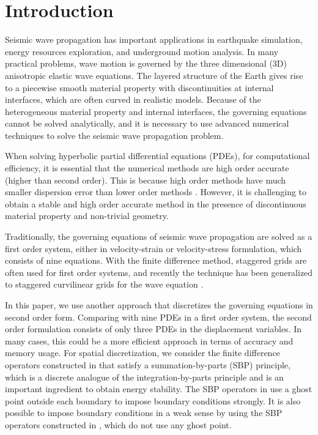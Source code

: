 \section{Introduction}
Seismic wave propagation has important applications in earthquake simulation, energy resources exploration, and underground motion analysis. In many practical problems, wave motion is governed by the three dimensional (3D) anisotropic elastic wave equations. The layered structure of the Earth gives rise to a piecewise smooth material property with discontinuities at internal interfaces, which are often curved in realistic models. Because of the heterogeneous material property and internal interfaces, the governing equations cannot be solved analytically, and it is necessary to use advanced numerical techniques to solve the seismic wave propagation problem.

When solving hyperbolic partial differential equations (PDEs), for computational efficiency, it is essential that the numerical methods are high order accurate (higher than second order). This is because high order methods have much smaller dispersion error than lower order methods  \cite{Hagstrom2012,Kreiss1972}. However, it is challenging to obtain a stable and high order accurate method in the presence of discontinuous material property and non-trivial geometry. 

Traditionally, the governing equations of seismic wave propagation are solved as a first order system, either in velocity-strain or velocity-stress formulation, which consists of nine equations. With the finite difference method, staggered grids are often used for first order systems, and recently the technique has been generalized to staggered curvilinear grids for the wave equation \cite{OReilly2020}.

In this paper, we use another approach that discretizes the governing equations in second order form. Comparing with nine PDEs in a first order system, the second order formulation consists of only three PDEs in the displacement variables. In many cases, this could be a more efficient approach in terms of accuracy and memory usage. For spatial discretization, we consider the finite difference operators constructed in \cite{sjogreen2012fourth} that satisfy a summation-by-parts (SBP) principle, which is a discrete analogue of the integration-by-parts principle and is an important ingredient to obtain energy stability. The SBP operators in \cite{sjogreen2012fourth} use a ghost point outside each boundary to impose boundary conditions strongly. It is also possible to impose boundary conditions in a weak sense \cite{Carpenter1994} by using the SBP operators constructed in \cite{Mattsson2012}, which do not use any ghost point.

